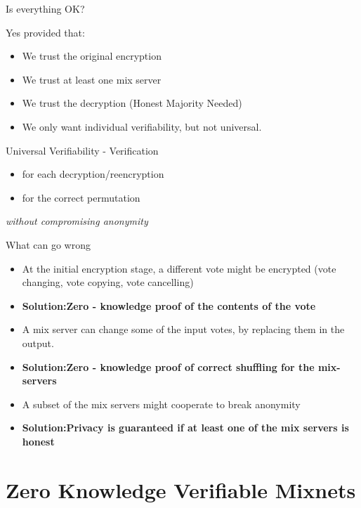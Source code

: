 \documentclass{beamer}
\begin{document}
\begin{frame}{Is everything OK?}
\begin{block}{Yes provided that:}
\begin{itemize}
\item We trust the original encryption
\item We trust at least one mix server
\item We trust the decryption (Honest Majority Needed)
\item We only want individual verifiability, but not universal.
\end{itemize}
\end{block}
\begin{block}{Universal Verifiability - Verification}
\begin{itemize}
\item for each decryption/reencryption
\item for the correct permutation
\end{itemize}
\textit{without compromising anonymity}
\end{block}

\end{frame} 

\begin{frame}{What can go wrong}
\begin{itemize}
\item At the initial encryption stage, a different vote might be encrypted (vote changing, vote copying, vote cancelling)
\item \textbf{Solution:Zero - knowledge proof of the contents of the vote}
\item A mix server can change some of the input votes, by replacing them in the output.
\item \textbf{Solution:Zero - knowledge proof of correct shuffling for the mix-servers}
\item A subset of the mix servers might cooperate to break anonymity
\item \textbf{Solution:Privacy is guaranteed if at least one of the mix servers is honest}
\end{itemize}
\end{frame} 

\section{Zero Knowledge Verifiable Mixnets}
\end{document}
